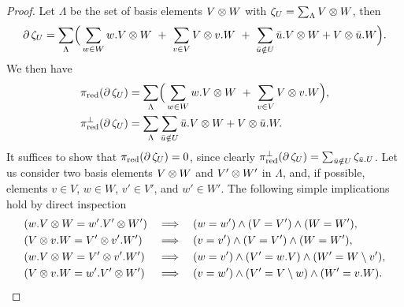 \begin{proof}
	Let $\Lambda$ be the set of basis elements $V \otimes W$ with $\zeta_U = \sum_\Lambda V \otimes W$, then
	\[
	\operatorname{\partial} \zeta_U =
	\sum_{\Lambda} \!\Big(\sum_{w \in W} w.V \otimes W \ + \
	\sum_{v \in V} V \otimes v.W \ + \
	\sum_{\bar u \notin U} \bar u.V \otimes  W + V \otimes \bar u.W\Big).
	\]
	We then have
	\begin{align*}
		\operatorname{\pi_{\text{red}}}(\operatorname{\partial} \zeta_U) &=
		\sum_{\Lambda} \!\Big(\sum_{w \in W} w.V \otimes W \ + \
		\sum_{v \in V} V \otimes v.W\Big), \\
		\pi^\perp_{\text{red}}(\operatorname{\partial} \zeta_U) &=
		\sum_{\Lambda} \sum_{\bar u \notin U} \bar u.V \otimes  W + V \otimes \bar u.W.
	\end{align*}
	It suffices to show that $\operatorname{\pi_{\text{red}}}(\operatorname{\partial} \zeta_U) = 0$, since clearly $\pi^\perp_{\text{red}}(\operatorname{\partial} \zeta_U) = \sum_{\bar u \notin U} \zeta_{\bar u.U}$.
	Let us consider two basis elements $V \otimes W$ and $V' \otimes W'$ in $\Lambda$, and, if possible, elements $v \in V$, $w \in W$, $v' \in V'$, and $w' \in W'$.
	The following simple implications hold by direct inspection
	\begin{align*}
		&(w.V \otimes W = w'.V' \otimes W') &\implies& &&(w = w') \wedge (V = V') \wedge (W = W'), \\
		&(V \otimes v.W = V' \otimes v'.W') &\implies& &&(v = v') \wedge (V = V') \wedge (W = W'), \\
		&(w.V \otimes W = V' \otimes v'.W') &\implies& &&(w = v') \wedge (V' = w.V) \wedge (W' = W \setminus v'), \\
		&(V \otimes v.W = w'.V' \otimes W') &\implies& &&(v = w') \wedge (V' = V \setminus w) \wedge (W' = v.W).
	\end{align*}
\end{proof}


